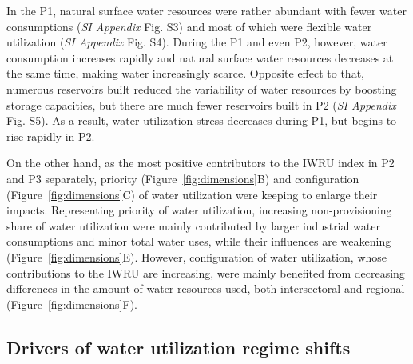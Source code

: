 \documentclass[9pt, twocolumn, twoside, lineno]{pnas-new}
\begin{document}
In the P1, natural surface water resources were rather abundant with fewer water consumptions (\textit{SI Appendix} Fig. S3) and most of which were flexible water utilization (\textit{SI Appendix} Fig. S4). During the P1 and even P2, however, water consumption increases rapidly and natural surface water resources decreases at the same time, making water increasingly scarce. Opposite effect to that, numerous reservoirs built reduced the variability of water resources by boosting storage capacities, but there are much fewer reservoirs built in P2 (\textit{SI Appendix} Fig. S5). As a result, water utilization stress decreases during P1, but begins to rise rapidly in P2.

On the other hand, as the most positive contributors to the IWRU index in P2 and P3 separately, priority (Figure~\ref{fig:dimensions}B) and configuration (Figure~\ref{fig:dimensions}C) of water utilization were keeping to enlarge their impacts. 
Representing priority of water utilization, increasing non-provisioning share of water utilization were mainly contributed by larger industrial water consumptions and minor total water uses, while their influences are weakening (Figure~\ref{fig:dimensions}E).
However, configuration of water utilization, whose contributions to the IWRU are increasing, were mainly benefited from decreasing differences in the amount of water resources used, both intersectoral and regional (Figure~\ref{fig:dimensions}F).


\subsection*{Drivers of water utilization regime shifts}
\end{document}
